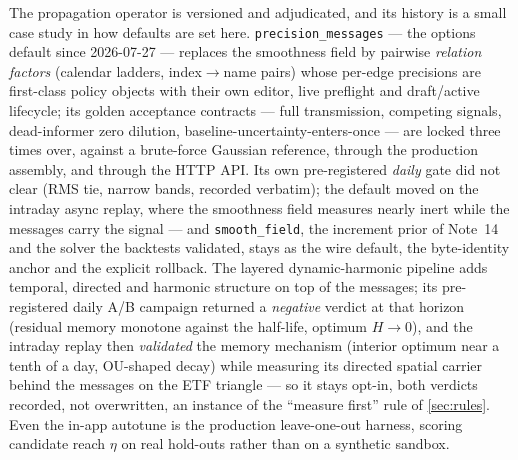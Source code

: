 \documentclass[11pt]{article}
\begin{document}
The propagation operator is versioned and adjudicated, and its history is a
small case study in how defaults are set here.
\texttt{precision\_messages} --- the options default since 2026-07-27 ---
replaces the smoothness
field by pairwise \emph{relation factors} (calendar ladders, index$\to$name
pairs) whose per-edge precisions are first-class policy objects with their own
editor, live preflight and draft/active lifecycle; its golden acceptance
contracts --- full transmission, competing signals, dead-informer zero
dilution, baseline-uncertainty-enters-once --- are locked three times over,
against a brute-force Gaussian reference, through the production assembly, and
through the HTTP API.  Its own pre-registered \emph{daily} gate did not
clear (RMS tie, narrow bands, recorded verbatim); the default moved on the
intraday async replay, where the smoothness field measures nearly inert
while the messages carry the signal --- and \texttt{smooth\_field}, the
increment prior of Note~14 and the solver the backtests validated, stays as
the wire default, the byte-identity anchor and the explicit rollback.
The layered dynamic-harmonic pipeline adds temporal,
directed and harmonic structure on top of the messages; its pre-registered
daily A/B
campaign returned a \emph{negative} verdict at that horizon (residual
memory monotone against the half-life, optimum $H\to0$), and the intraday
replay then \emph{validated} the memory mechanism (interior optimum near a
tenth of a day, OU-shaped decay) while measuring its directed spatial
carrier behind the messages on the ETF triangle --- so it stays opt-in,
both verdicts recorded, not overwritten, an instance of the ``measure
first'' rule of \cref{sec:rules}. Even the in-app autotune is the production
leave-one-out harness, scoring candidate reach $\eta$ on real hold-outs rather
than on a synthetic sandbox.
\end{document}
